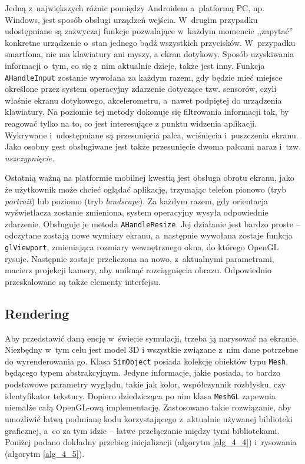 		Jedną z~największych różnic pomiędzy Androidem a~platformą PC, np. Windows, jest sposób obsługi urządzeń wejścia. W~drugim przypadku udostępniane są zazwyczaj funkcje pozwalające w~każdym momencie ,,zapytać'' konkretne urządzenie o~stan jednego bądź wszystkich przycisków. W~przypadku smartfona, nie ma klawiatury ani myszy, a ekran dotykowy. Sposób uzyskiwania informacji o~tym, co się z~nim aktualnie dzieje, także jest inny. Funkcja \texttt{AHandleInput} zostanie wywołana za każdym razem, gdy będzie mieć miejsce określone przez system operacyjny zdarzenie dotyczące tzw. sensorów, czyli właśnie ekranu dotykowego, akcelerometru, a~nawet podpiętej do urządzenia klawiatury. Na poziomie tej metody dokonuje się filtrowania informacji tak, by reagować tylko na to, co jest interesujące z punktu widzenia aplikacji. Wykrywane i~udostępniane są przesunięcia palca, wciśnięcia i~puszczenia ekranu. Jako osobny gest obsługiwane jest także przesunięcie dwoma palcami naraz i~tzw. \emph{uszczypnięcie}.
		
		Ostatnią ważną na platformie mobilnej kwestią jest obsługa obrotu ekranu, jako że użytkownik może chcieć oglądać aplikację, trzymając telefon pionowo (tryb \emph{portrait}) lub poziomo (tryb \emph{landscape}). Za każdym razem, gdy orientacja wyświetlacza zostanie zmieniona, system operacyjny wysyła odpowiednie zdarzenie. Obsługuje je metoda \texttt{AHandleResize}. Jej działanie jest bardzo proste -- odczytane zostają nowe wymiary ekranu, a~następnie wywołana zostaje funkcja \texttt{glViewport}, zmieniająca rozmiary wewnętrznego okna, do którego OpenGL rysuje. Następnie zostaje przeliczona na nowo, z~aktualnymi parametrami, macierz projekcji kamery, aby uniknąć rozciągnięcia obrazu. Odpowiednio przeskalowane są także elementy interfejsu.
		
		\subsection{Rendering}
		\label{t:praktyka:silnik:render}
		
		
		Aby przedstawić daną encję w~świecie symulacji, trzeba ją narysować na ekranie. Niezbędny w~tym celu jest model 3D i wszystkie związane z~nim dane potrzebne do wyrenderowania go. Klasa \texttt{SimObject} posiada kolekcję obiektów typu \texttt{Mesh}, będącego typem abstrakcyjnym. Jedyne informacje, jakie posiada, to bardzo podstawowe parametry wyglądu, takie jak kolor, współczynnik rozbłysku, czy identyfikator tekstury. Dopiero dziedzicząca po nim klasa \texttt{MeshGL} zapewnia niemalże całą OpenGL-ową implementację. Zastosowano takie rozwiązanie, aby umożliwić łatwą podmianę kodu korzystającego z~aktualnie używanej biblioteki graficznej, a~co za tym idzie -- łatwe przełączanie między tymi bibliotekami. Poniżej podano dokładny przebieg inicjalizacji (algorytm \ref{alg_4_4}) i~rysowania (algorytm \ref{alg_4_5}).
		\newline
		
